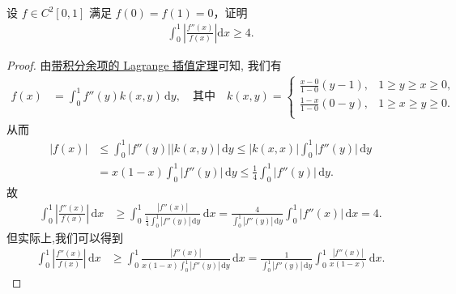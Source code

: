\documentclass[../../main.tex]{subfiles}
\begin{document}
\begin{example}
设 $f \in C^2[0,1]$ 满足 $f(0) = f(1) = 0$，证明
\begin{align*}
\int_{0}^{1} \left| \frac{f''(x)}{f(x)} \right| \mathrm{d}x \geqslant  4.
\end{align*}
\end{example}
\begin{proof}
由\hyperref[theorem:带积分型余项的Lagrange插值公式]{带积分余项的 Lagrange 插值定理}可知, 我们有
\begin{align*}
f(x) &= \int_0^1 f''(y) k(x,y) \, \mathrm{d}y, \quad \text{其中} \quad k(x,y) = 
\begin{cases}
\frac{x-0}{1-0}(y-1),&		1\ge y\ge x\ge 0,\\
\frac{1-x}{1-0}(0-y),&		1\ge x\ge y\ge 0.\\
\end{cases}
\end{align*}
从而
\begin{align*}
|f(x)| &\leqslant \int_0^1 |f''(y)| |k(x,y)| \, \mathrm{d}y \leqslant |k(x,x)| \int_0^1 |f''(y)| \, \mathrm{d}y \\
&= x(1-x) \int_0^1 |f''(y)| \, \mathrm{d}y \leqslant \frac{1}{4} \int_0^1 |f''(y)| \, \mathrm{d}y.
\end{align*}
故
\begin{align*}
\int_0^1 \left| \frac{f''(x)}{f(x)} \right| \, \mathrm{d}x &\geqslant \int_0^1 \frac{|f''(x)|}{\frac{1}{4} \int_0^1 |f''(y)| \, \mathrm{d}y} \, \mathrm{d}x = \frac{4}{\int_0^1 |f''(y)| \, \mathrm{d}y} \int_0^1 |f''(x)| \, \mathrm{d}x = 4.
\end{align*}
但实际上,我们可以得到
\begin{align*}
\int_0^1 \left| \frac{f''(x)}{f(x)} \right| \, \mathrm{d}x &\geqslant \int_0^1 \frac{|f''(x)|}{x(1-x) \int_0^1 |f''(y)| \, \mathrm{d}y} \, \mathrm{d}x = \frac{1}{\int_0^1 |f''(y)| \, \mathrm{d}y} \int_0^1 \frac{|f''(x)|}{x(1-x)} \, \mathrm{d}x.
\end{align*}

\end{proof}
\end{document}
